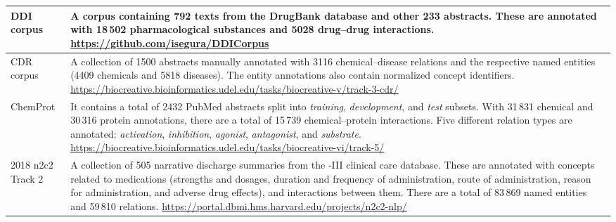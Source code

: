\begin{longtable}[c]{E{0.30\textwidth}p{0.62\textwidth}}
\midrule

DDI corpus\newline
{}\newline
{}\newline
{}
&
A corpus containing 792 texts from the DrugBank database and other 233  abstracts. These are annotated with 18\,502 pharmacological substances and 5028 drug--drug interactions.\newline
{\footnotesize\url{https://github.com/isegura/DDICorpus}}
\\

\midrule

CDR corpus\newline
{}
&
A collection of 1500  abstracts manually annotated with 3116 chemical--disease relations and the respective named entities (4409 chemicals and 5818 diseases). The entity annotations also contain normalized  concept identifiers.\newline
{\footnotesize\url{https://biocreative.bioinformatics.udel.edu/tasks/biocreative-v/track-3-cdr/}}
\\

\midrule

ChemProt\newline
{}
&
It contains a total of 2432 PubMed abstracts split into \textit{training}, \textit{development}, and \textit{test} subsets. With 31\,831 chemical and 30\,316 protein annotations, there are a total of 15\,739 chemical--protein interactions. Five different relation types are annotated: \textit{activation}, \textit{inhibition}, \textit{agonist}, \textit{antagonist}, and \textit{substrate}.\newline
{\footnotesize\url{https://biocreative.bioinformatics.udel.edu/tasks/biocreative-vi/track-5/}}
\\

\midrule

2018 n2c2 Track 2\newline
{}
&
A collection of 505 narrative discharge summaries from the -III clinical care database. These are annotated with concepts related to medications (strengths and dosages, duration and frequency of administration, route of administration, reason for administration, and adverse drug effects), and interactions between them. There are a total of 83\,869 named entities and 59\,810 relations.\newline
{\footnotesize\url{https://portal.dbmi.hms.harvard.edu/projects/n2c2-nlp/}}
\\


\end{longtable}
